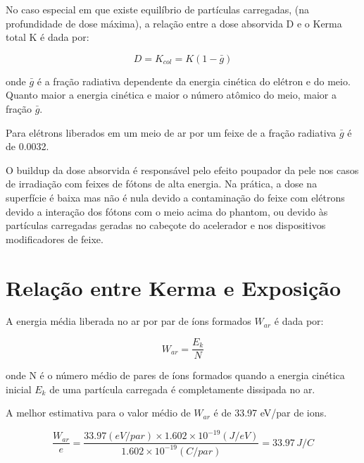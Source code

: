 \documentclass[11pt,a4paper]{article}
\newcounter{exemplo}
\begin{document}
		No caso especial em que existe equilíbrio de partículas carregadas, (na profundidade de dose máxima), a relação entre a dose absorvida D e o Kerma total K é dada por:

			\begin{equation}
				D = K_{col} = K(1 - \bar{g})
			\end{equation}

		\noindent onde $\bar{g}$ é a fração radiativa dependente da energia cinética do elétron e do meio. Quanto maior a energia cinética e maior o número atômico do meio, maior a fração $\bar{g}$.

		\begin{exemplo}[Exemplo]
			Para elétrons liberados em um meio de ar por um feixe de  a fração radiativa $\bar{g}$ é de 0.0032.
		\end{exemplo}

		O buildup da dose absorvida é responsável pelo efeito poupador da pele nos casos de irradiação com feixes de fótons de alta energia. Na prática, a dose na superfície é baixa mas não é nula devido a contaminação do feixe com elétrons devido a interação dos fótons com o meio acima do phantom, ou devido às partículas carregadas geradas no cabeçote do acelerador e nos dispositivos modificadores de feixe.

	\section{Relação entre Kerma e Exposição}

		A energia média liberada no ar por par de íons formados $W_{ar}$ é dada por:

			\begin{equation}
				W_{ar} = \frac{E_k}{N}
			\end{equation}

		\noindent onde N é o número médio de pares de íons formados quando a energia cinética inicial $E_k$ de uma partícula carregada é completamente dissipada no ar.

		\begin{exemplo}
			A melhor estimativa para o valor médio de $W_{ar}$ é de 33.97 eV/par de ions.

			\begin{equation}
				\frac{W_{ar}}{e} 
				= \frac{33.97 (eV/par)\times 1.602 \times 10^{-19} (J/eV)}{1.602 \times 10^{-19}(C/par)}
				= 33.97 \, J/C
			\end{equation}
		\end{exemplo}
\end{document}
